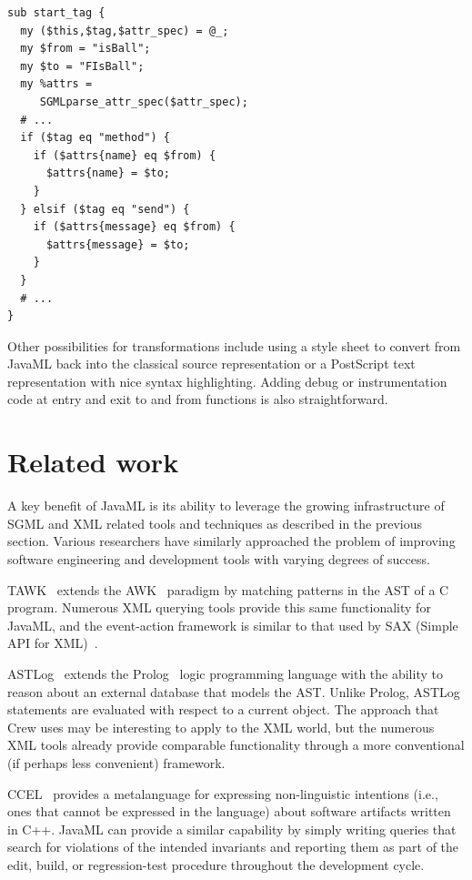 \documentclass{article}
\begin{document}
\begin{verbatim}
sub start_tag { 
  my ($this,$tag,$attr_spec) = @_;
  my $from = "isBall";
  my $to = "FIsBall";
  my %attrs = 
     SGMLparse_attr_spec($attr_spec);
  # ...
  if ($tag eq "method") {
    if ($attrs{name} eq $from) {
      $attrs{name} = $to;
    }
  } elsif ($tag eq "send") {
    if ($attrs{message} eq $from) {
      $attrs{message} = $to;
    }
  }
  # ...
}
\end{verbatim}

Other possibilities for transformations include using a style sheet to
convert from JavaML back into the classical source representation or a
PostScript text representation with nice syntax highlighting.  Adding
debug or instrumentation code at entry and exit to and from functions is
also straightforward.

\section{Related work}
\label{sec-related}

A key benefit of JavaML is its ability to leverage the growing
infrastructure of SGML and XML related tools and techniques as described
in the previous section.  Various researchers have similarly approached
the problem of improving software engineering and development tools with
varying degrees of success.

TAWK~\cite{Griswold96} extends the AWK~\cite{Dougherty90} paradigm by matching
patterns in the AST of a C program.  Numerous XML querying tools provide
this same functionality for JavaML, and the event-action framework is
similar to that used by SAX (Simple API for XML)~\cite{SAX}.

ASTLog~\cite{Crew97} extends the Prolog~\cite{Clock94} logic programming
language with the ability to reason about an external database that
models the AST.  Unlike Prolog, ASTLog statements are evaluated with
respect to a current object.  The approach that Crew uses may be
interesting to apply to the XML world, but the numerous XML tools
already provide comparable functionality through a more conventional (if
perhaps less convenient) framework.

CCEL~\cite{CCEL92} provides a metalanguage for expressing non-linguistic
intentions (i.e., ones that cannot be expressed in the language) about
software artifacts written in C++.  JavaML can provide a similar
capability by simply writing queries that search for violations of the
intended invariants and reporting them as part of the edit, build, or
regression-test procedure throughout the development cycle.
\end{document}
